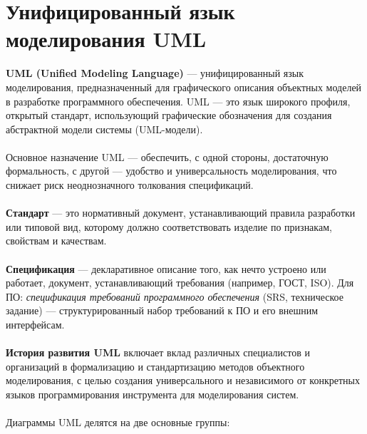 \documentclass[a4paper, 12pt]{report}
\numberwithin{equation}{section}
\begin{document}
    \section{Унифицированный язык моделирования UML}
    \textbf{UML (Unified Modeling Language)} — унифицированный язык моделирования, предназначенный для графического описания объектных моделей в разработке программного обеспечения. UML — это язык широкого профиля, открытый стандарт, использующий графические обозначения для создания абстрактной модели системы (UML-модели).
\\\\
Основное назначение UML — обеспечить, с одной стороны, достаточную формальность, с другой — удобство и универсальность моделирования, что снижает риск неоднозначного толкования спецификаций.
\\\\
\textbf{Стандарт} — это нормативный документ, устанавливающий правила разработки или типовой вид, которому должно соответствовать изделие по признакам, свойствам и качествам.
\\\\
\textbf{Спецификация} — декларативное описание того, как нечто устроено или работает, документ, устанавливающий требования (например, ГОСТ, ISO). Для ПО: \textit{спецификация требований программного обеспечения} (SRS, техническое задание) — структурированный набор требований к ПО и его внешним интерфейсам.
\\\\
\textbf{История развития UML} включает вклад различных специалистов и организаций в формализацию и стандартизацию методов объектного моделирования, с целью создания универсального и независимого от конкретных языков программирования инструмента для моделирования систем.
\\\\
Диаграммы UML делятся на две основные группы:
\end{document}
